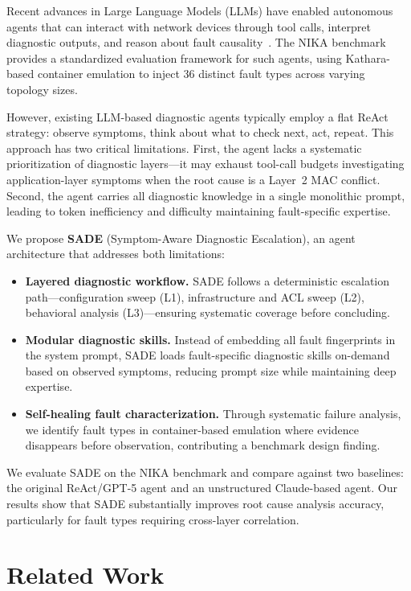 \documentclass[conference]{IEEEtran}
\begin{document}
Recent advances in Large Language Models (LLMs) have enabled autonomous agents that can interact with network devices through tool calls, interpret diagnostic outputs, and reason about fault causality~\cite{nika}. The NIKA benchmark~\cite{nika} provides a standardized evaluation framework for such agents, using Kathara-based container emulation to inject 36 distinct fault types across varying topology sizes.

However, existing LLM-based diagnostic agents typically employ a flat ReAct~\cite{react} strategy: observe symptoms, think about what to check next, act, repeat. This approach has two critical limitations. First, the agent lacks a systematic prioritization of diagnostic layers---it may exhaust tool-call budgets investigating application-layer symptoms when the root cause is a Layer~2 MAC conflict. Second, the agent carries all diagnostic knowledge in a single monolithic prompt, leading to token inefficiency and difficulty maintaining fault-specific expertise.

We propose \textbf{SADE} (Symptom-Aware Diagnostic Escalation), an agent architecture that addresses both limitations:

\begin{itemize}    \item \textbf{Layered diagnostic workflow.} SADE follows a deterministic escalation path---configuration sweep (L1), infrastructure and ACL sweep (L2), behavioral analysis (L3)---ensuring systematic coverage before concluding.
    \item \textbf{Modular diagnostic skills.} Instead of embedding all fault fingerprints in the system prompt, SADE loads fault-specific diagnostic skills on-demand based on observed symptoms, reducing prompt size while maintaining deep expertise.
    \item \textbf{Self-healing fault characterization.} Through systematic failure analysis, we identify fault types in container-based emulation where evidence disappears before observation, contributing a benchmark design finding.
\end{itemize}

We evaluate SADE on the NIKA benchmark and compare against two baselines: the original ReAct/GPT-5 agent and an unstructured Claude-based agent. Our results show that SADE substantially improves root cause analysis accuracy, particularly for fault types requiring cross-layer correlation.

\section{Related Work}
\end{document}
